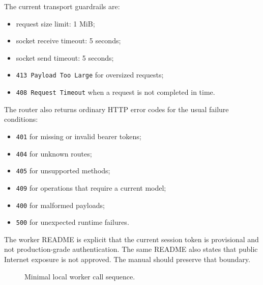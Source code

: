 The current transport guardrails are:
\begin{itemize}
\item request size limit: 1 MiB;
\item socket receive timeout: 5 seconds;
\item socket send timeout: 5 seconds;
\item \texttt{413 Payload Too Large} for oversized requests;
\item \texttt{408 Request Timeout} when a request is not completed in time.
\end{itemize}

The router also returns ordinary HTTP error codes for the usual failure
conditions:
\begin{itemize}
\item \texttt{401} for missing or invalid bearer tokens;
\item \texttt{404} for unknown routes;
\item \texttt{405} for unsupported methods;
\item \texttt{409} for operations that require a current model;
\item \texttt{400} for malformed payloads;
\item \texttt{500} for unexpected runtime failures.
\end{itemize}

The worker README is explicit that the current session token is provisional and
not production-grade authentication. The same README also states that public
Internet exposure is not approved. The manual should preserve that boundary.

\begin{figure}[htbp]
\centering
\caption{Minimal local worker call sequence.}
\label{fig:worker-local-call-sequence}
\end{figure}

